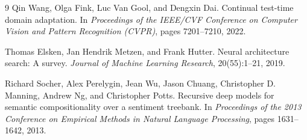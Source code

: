 \documentclass[11pt,a4paper]{article}
\theoremstyle{definition}
\begin{document}
\begin{thebibliography}{9}
Qin Wang, Olga Fink, Luc Van Gool, and Dengxin Dai.
Continual test-time domain adaptation.
In \textit{Proceedings of the IEEE/CVF Conference on Computer Vision and Pattern Recognition (CVPR)}, pages 7201--7210, 2022.

Thomas Elsken, Jan Hendrik Metzen, and Frank Hutter.
Neural architecture search: A survey.
\textit{Journal of Machine Learning Research}, 20(55):1--21, 2019.

Richard Socher, Alex Perelygin, Jean Wu, Jason Chuang, Christopher D. Manning, Andrew Ng, and Christopher Potts.
Recursive deep models for semantic compositionality over a sentiment treebank.
In \textit{Proceedings of the 2013 Conference on Empirical Methods in Natural Language Processing}, pages 1631--1642, 2013.

\end{thebibliography}
\end{document}
